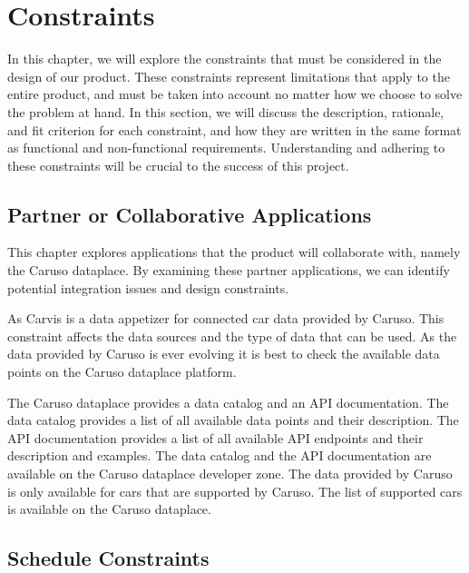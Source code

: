 \chapter{Constraints}

In this chapter, we will explore the constraints that must be considered in the design of our product. These constraints represent limitations that apply to the entire product, and must be taken into account no matter how we choose to solve the problem at hand. In this section, we will discuss the description, rationale, and fit criterion for each constraint, and how they are written in the same format as functional and non-functional requirements. Understanding and adhering to these constraints will be crucial to the success of this project.

\section{Partner or Collaborative Applications}

This chapter explores applications that the product will collaborate with, namely the Caruso dataplace. By examining these partner applications, we can identify potential integration issues and design constraints.

As Carvis is a data appetizer for connected car data provided by Caruso. This constraint affects the data sources and the type of data that can be used. As the data provided by Caruso is ever evolving it is best to check the available data points on the Caruso dataplace platform. 

The Caruso dataplace provides a data catalog and an API documentation. The data catalog provides a list of all available data points and their description. The API documentation provides a list of all available API endpoints and their description and examples. The data catalog and the API documentation are available on the Caruso dataplace developer zone. The data provided by Caruso is only available for cars that are supported by Caruso. The list of supported cars is available on the Caruso dataplace.

\section{Schedule Constraints}

